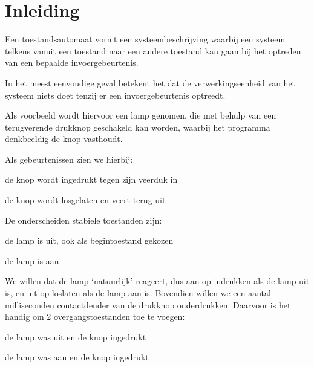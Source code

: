 \documentclass[a4paper, 11pt, fleqn, twoside]{scrartcl}%
\renewenvironment{description}[1][1em]%
 {\list{}{\labelwidth=0pt \leftmargin=#1
  \let\makelabel\descriptionlabel}}
 {\endlist}
\begin{document}
\pagestyle{RvLpagina}

\section{Inleiding}
Een toestandsautomaat vormt een systeembeschrijving waarbij een systeem
 telkens vanuit een toestand naar een andere toestand kan gaan bij het optreden
 van een bepaalde invoergebeurtenis.

In het meest eenvoudige geval betekent het dat de verwerkingseenheid van
 het systeem niets doet tenzij er een invoergebeurtenis optreedt.

Als voorbeeld wordt hiervoor een lamp genomen, die met behulp van een
 terugverende drukknop geschakeld kan worden, waarbij het programma denkbeeldig
 de knop vasthoudt.

Als gebeurtenissen zien we hierbij:
\begin{description}[1.2em]
\item[in] de knop wordt ingedrukt tegen zijn veerduk in
\item[los] de knop wordt losgelaten en veert terug uit
\end{description}

De onderscheiden stabiele toestanden zijn:
\begin{description}
\item[uit] de lamp is uit, ook als begintoestand gekozen
\item[aan] de lamp is aan
\end{description}

We willen dat de lamp `natuurlijk' reageert, dus aan op indrukken als de lamp
 uit is, en uit op loslaten als de lamp aan is. Bovendien willen we een 
 aantal milliseconden contactdender van de drukknop onderdrukken.
 Daarvoor is het handig om 2 overgangstoestanden toe te voegen:
\begin{description}
\item[uit1] de lamp was uit en de knop ingedrukt
\item[aan1] de lamp was aan en de knop ingedrukt
\end{description}
\end{document}
